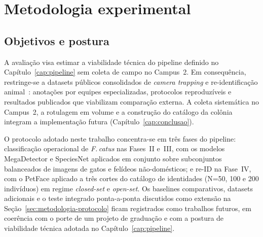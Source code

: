 \chapter{Metodologia experimental}
\label{cap:metodologia}

\section{Objetivos e postura}
\label{sec:metodologia-visao-geral}

A avaliação visa estimar a viabilidade técnica do pipeline definido no Capítulo~\ref{cap:pipeline} sem coleta de campo no Campus~2. Em consequência, restringe-se a datasets públicos consolidados de \textit{camera trapping} e re-identificação animal~\cite{shinoda2024petface,adam2024wildlifereid10k,beery2018terra}: anotações por equipes especializadas, protocolos reproduzíveis e resultados publicados que viabilizam comparação externa. A coleta sistemática no Campus~2, a rotulagem em volume e a construção do catálogo da colônia integram a implementação futura (Capítulo~\ref{cap:conclusao}).

O protocolo adotado neste trabalho concentra-se em três fases do pipeline: classificação operacional de \textit{F.\,catus} nas Fases~II e~III, com os modelos MegaDetector e SpeciesNet aplicados em conjunto sobre subconjuntos balanceados de imagens de gatos e felídeos não-domésticos; e re-ID na Fase~IV, com o PetFace aplicado a três cortes do catálogo de identidades (N=50, 100 e 200 indivíduos) em regime \textit{closed-set} e \textit{open-set}. Os baselines comparativos, datasets adicionais e o teste integrado ponta-a-ponta discutidos como extensão na Seção~\ref{sec:metodologia-protocolo} ficam registrados como trabalhos futuros, em coerência com o porte de um projeto de graduação e com a postura de viabilidade técnica adotada no Capítulo~\ref{cap:pipeline}.

